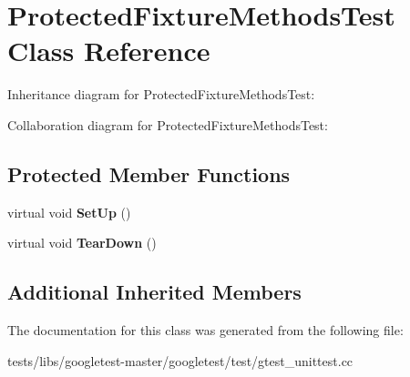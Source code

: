 \hypertarget{classProtectedFixtureMethodsTest}{}\section{Protected\+Fixture\+Methods\+Test Class Reference}
\label{classProtectedFixtureMethodsTest}


Inheritance diagram for Protected\+Fixture\+Methods\+Test\+:


Collaboration diagram for Protected\+Fixture\+Methods\+Test\+:
\subsection*{Protected Member Functions}
\begin{DoxyCompactItemize}
\item 
\mbox{\label{classProtectedFixtureMethodsTest_a5184c708ac89cfb69f0e4c742e93398a}} 
virtual void {\bfseries Set\+Up} ()
\item 
\mbox{\label{classProtectedFixtureMethodsTest_aa143dff0a99903cde207b6fd0042c03c}} 
virtual void {\bfseries Tear\+Down} ()
\end{DoxyCompactItemize}
\subsection*{Additional Inherited Members}


The documentation for this class was generated from the following file\+:\begin{DoxyCompactItemize}
\item 
tests/libs/googletest-\/master/googletest/test/gtest\+\_\+unittest.\+cc\end{DoxyCompactItemize}
